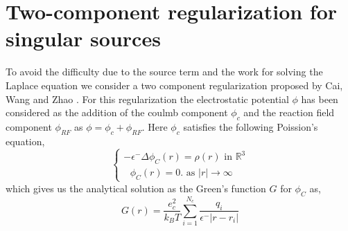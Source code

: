 \section{Two-component regularization for singular sources}
\label{2_comp_reg}
To avoid the difficulty due to the source term and the work for solving the Laplace equation we consider a two component regularization proposed by Cai, Wang and Zhao \cite{Cai2009}. For this regularization the electrostatic potential $\phi$ has been considered as the addition of the coulmb component $\phi_c$ and the reaction field component $\phi_{RF}$ as $\phi= \phi_c +\phi_{RF}$. Here $\phi_c$ satisfies the following Poission's equation, 
\begin{equation}
	\begin{cases}
		-\epsilon^- \Delta\phi_C(r) = \rho(r) \text{   in   }\mathbb{R}^3 \label{rho_eq} \\
		\text{      }\phi_C(r)= 0. \text{   as  } |r| \rightarrow \infty
	\end{cases}
\end{equation}
which gives us the analytical solution as the Green's function $G$ for $\phi_C$ as,
\begin{equation}
	G(r) = \frac{e_c^2}{k_B T } \sum_{i=1}^{N_c} \frac{q_i }{\epsilon^{-}|r-r_i|} \label{Green} %
\end{equation}
	
